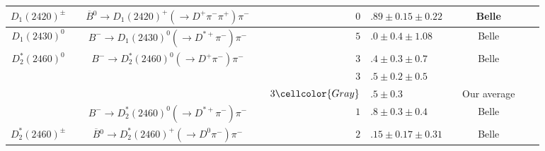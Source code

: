 {\begin{tabular}{cp{5pt}cp{5pt}r@{}lp{5pt}cp{5pt}c}
		\multirow{1}{*}{$D_{1}^{}(2420)^{\pm}$}      &   & \multirow{1}{*}{$\overline{B}{}^{0}\to D_{1}(2420)^{+}(\to D^{+}\pi^{-}\pi^{+})\pi^{-}$} & \cellcolor{LightGray} & \cellcolor{LightGray} $0$            & \cellcolor{LightGray}$.89\pm0.15\pm0.22$        & \cellcolor{LightGray} & \cellcolor{LightGray} Belle   & \cellcolor{LightGray} & \cite{Abe:2004sm}    \\ \midrule
		\multirow{1}{*}{$D_{1}(2430)^{0}$}           &   & $B^{-}\to D_{1}(2430)^{0}(\to D^{*+}\pi^{-})\pi^{-}$                                     & \cellcolor{LightGray} & \cellcolor{LightGray}$5$             & \cellcolor{LightGray}$.0\pm0.4\pm1.08$          & \cellcolor{LightGray} & \cellcolor{LightGray} Belle   & \cellcolor{LightGray} & \cite{Abe:2003zm}    \\ \midrule
		\multirow{4}{*}[-5pt]{$D_{2}^{*}(2460)^{0}$} &   & \multirow{3}{*}{$B^{-}\to D_{2}^{*}(2460)^{0}(\to D^{+}\pi^{-})\pi^{-}$}                 &                       & $3$                                  & $.4\pm0.3\pm0.7$                                &                       & Belle                         &                       & \cite{Abe:2003zm}    \\ 
		                                             &   &                                                                                          &                       & $3$                                  & $.5\pm0.2\pm0.5$                                &                       & \babar{}                      &                       & \cite{Aubert:2009wg} \\ \cmidrule{4-9}
		                                             &   &                                                                                          & \cellcolor{Gray}      & \cellcolor{Gray} $3\cellcolor{Gray}$ & \cellcolor{Gray}$.5 \pm 0.3$                    & \cellcolor{Gray}      & \cellcolor{Gray}  Our average & \cellcolor{Gray}      &                      \\ \cmidrule{3-9}
		                                             &   & \multirow{1}{*}{$B^{-}\to D_{2}^{*}(2460)^{0}(\to D^{*+}\pi^{-})\pi^{-}$}                & \cellcolor{LightGray} & \cellcolor{LightGray} $1$            & \cellcolor{LightGray}$.8\pm0.3\pm0.4$           & \cellcolor{LightGray} & \cellcolor{LightGray} Belle   & \cellcolor{LightGray} & \cite{Abe:2003zm}    \\ \midrule
		\multirow{1}{*}{$D_{2}^{*}(2460)^{\pm}$}     &   & \multirow{1}{*}{$\overline{B}{}^{0}\to D_{2}^{*}(2460)^{+}(\to D^{0}\pi^{-})\pi^{-}$}    & \cellcolor{LightGray} & \cellcolor{LightGray} $2$            & \cellcolor{LightGray}$.15\pm0.17\pm0.31$        & \cellcolor{LightGray} & \cellcolor{LightGray} Belle   & \cellcolor{LightGray} & \cite{Kuzmin:2006mw} \\	\bottomrule	
	\end{tabular}
}